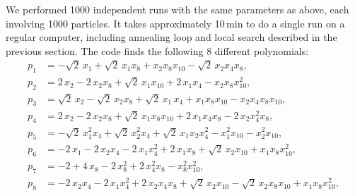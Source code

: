 \documentclass[11pt,a4paper]{article}
\begin{document}
	We performed 1000 independent runs with the same parameters as above, each involving 1000 particles. It takes approximately 10\,min to do a single run on a regular computer, including annealing loop and local search described in the previous section. The code finds the following 8 different polynomials:
	\begin{subequations} \label{eq:pols}
	 \begin{align}
	   p_{1} &= -\sqrt{2}\,x_{1} + \sqrt{2}\,x_{1}x_8 + x_{2}x_8x_{10} - \sqrt{2}\,x_{2}x_{4}x_8,\\[4pt]
	   p_{2} &= 2\,x_{2} - 2\,x_{2}x_8 + \sqrt{2}\,x_{1}x_{10} + 2\,x_{1}x_{4} - x_{2}x_8x_{10}^{2},\\[4pt]
	   p_{3} &= \sqrt{2}\,x_{2} - \sqrt{2}\,x_{2}x_8 + \sqrt{2}\,x_{1}\,x_{4} + x_{1}x_8x_{10}
	   		- x_{2}x_{4}x_8x_{10},\\[4pt]
	   p_{4} &= 2\,x_{2} - 2\,x_{2}x_8 + \sqrt{2}\,x_{1}x_8x_{10} + 2\,x_{1}x_{4}x_8
	   		- 2\,x_{2} x_{4}^{2}x_8,\\[4pt]
	   p_{5} &= -\sqrt{2}\,x_{1}^{2}x_{4} + \sqrt{2}\,x_{2}^{2}x_{4} + \sqrt{2}\,x_{1}x_{2}x_{4}^{2} - x_{1}^{2}x_{10}
	   		- x_{2}^{2}x_{10}, \\[4pt]
	   p_{6} &= -2\,x_{1} - 2\,x_{2}x_{4}- 2\,x_{1}x_{4}^{2} + 2\,x_{1}x_8 + \sqrt{2}\,x_{2}x_{10}
	   		+ x_{1}x_8x_{10}^{2},\\[4pt]
	   p_{7} &= -2 + 4\,x_{8} - 2\,x_8^2 + 2\,x_{4}^2 x_8 - x_8^2 x_{10}^2,\\[4pt]
	   p_{8} &= -2\,x_{2}x_{4} - 2\,x_{1}x_{4}^{2} + 2\,x_{2}x_{4}x_8 + \sqrt{2}\,x_{2}x_{10} 
	   		- \sqrt{2}\,x_{2}x_8x_{10} +  x_{1}x_8x_{10}^{2},
	 \end{align}
	\end{subequations}
\end{document}
